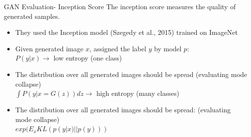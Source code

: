 \begin{frame} {GAN Evaluation- Inception Score}
\vspace{1mm}
The inception score measures the quality of generated samples.
\vspace{2mm}
  \begin{itemize}
   \item They used the Inception model (Szegedy et al., 2015)  trained on ImageNet
   \item Given generated image $x$, assigned the label $y$ by model $p$:\\
   $P(y|x)  \rightarrow $ low entropy (one class)
   \item The distribution over all generated images should be spread (evaluating mode collapse) \\
   $\int P(y|x = G(z)) dz \rightarrow $ high entropy (many classes)
   \item The distribution over all generated images should be spread: 
(evaluating mode collapse) \\
$exp (E_x KL (p (y|x) || p(y)))$
  \end{itemize}


\end{frame}

